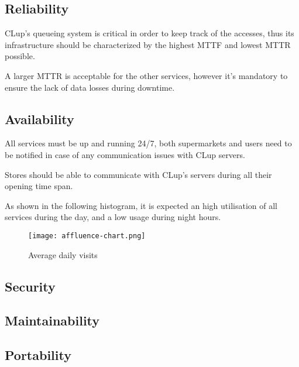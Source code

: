 \documentclass[../../main.tex]{subfiles}
\begin{document}
	\subsection{Reliability}

	CLup's queueing system is critical in order to keep track of the accesses, thus its infrastructure 
	should be characterized by the highest MTTF and lowest MTTR possible.

	A larger MTTR is acceptable for the other services, however it's mandatory to ensure the lack of 
	data losses during downtime.

	\subsection{Availability}

	All services must be up and running 24/7, both supermarkets and users need to be notified in case of 
	any communication issues with CLup servers.

	Stores should be able to communicate with CLup's servers during all their opening time span.

	As shown in the following histogram, it is expected an high utilisation of all services during the day, 
	and a low usage during night hours.

	\begin{figure}[h!]
	    \centering
	    \texttt{[image: affluence-chart.png]}
	    \caption{Average daily visits }
  	\end{figure}

	\subsection{Security}

	\subsection{Maintainability}

	\subsection{Portability}

	
\end{document}
